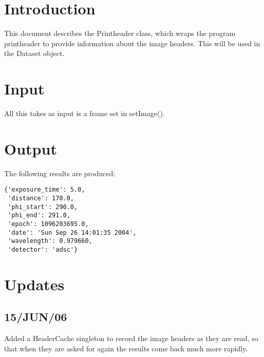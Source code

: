 \documentclass[a4paper, 11pt]{article}
\begin{document}
\section{Introduction}

This document describes the Printheader class, which wraps the program 
printheader to provide information about the image headers. This will
be used in the Dataset object.

\section{Input}

All this takes as input is a frame set in setImage().

\section{Output}

The following results are produced:

{
\small
\begin{verbatim}
{'exposure_time': 5.0, 
 'distance': 170.0, 
 'phi_start': 290.0, 
 'phi_end': 291.0, 
 'epoch': 1096203695.0, 
 'date': 'Sun Sep 26 14:01:35 2004', 
 'wavelength': 0.979660, 
 'detector': 'adsc'}
\end{verbatim}
}

\section{Updates}

\subsection{15/JUN/06}

Added a HeaderCache singleton to record the image headers as they are
read, so that when they are asked for again the results come back much 
more rapidly.
\end{document}
